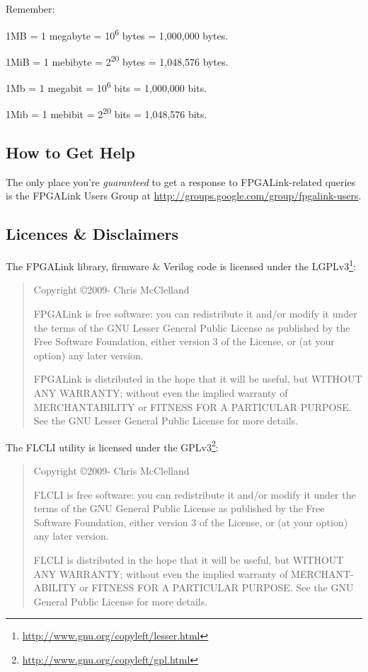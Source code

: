 Remember:
\begin{blobs}
  \item 1MB = 1 megabyte = 10\textsuperscript{6} bytes = 1,000,000 bytes.
  \item 1MiB = 1 mebibyte = 2\textsuperscript{20} bytes = 1,048,576 bytes.
  \item 1Mb = 1 megabit = 10\textsuperscript{6} bits = 1,000,000 bits.
  \item 1Mib = 1 mebibit = 2\textsuperscript{20} bits = 1,048,576 bits.
\end{blobs}

\subsection{How to Get Help}
The only place you're \textit{guaranteed} to get a response to FPGALink-related queries is the FPGALink Users Group at \url{http://groups.google.com/group/fpgalink-users}.

\newpage
\subsection{Licences \& Disclaimers}
The FPGALink library, firmware \& Verilog code is licensed under the LGPLv3\footnote{\url{http://www.gnu.org/copyleft/lesser.html}}:

\begin{quote}
Copyright \copyright 2009-{\the\year} Chris McClelland

FPGALink is free software: you can redistribute it and/or modify it under the terms of the GNU Lesser General Public License as published by the Free Software Foundation, either version 3 of the License, or (at your option) any later version.

FPGALink is distributed in the hope that it will be useful, but WITHOUT ANY WARRANTY; without even the implied warranty of MERCHANTABILITY or FITNESS FOR A PARTICULAR PURPOSE. See the GNU Lesser General Public License for more details.
\end{quote}

The FLCLI utility is licensed under the GPLv3\footnote{\url{http://www.gnu.org/copyleft/gpl.html}}:

\begin{quote}
Copyright \copyright 2009-{\the\year} Chris McClelland

FLCLI is free software: you can redistribute it and/or modify it under the terms of the GNU General Public License as published by the Free Software Foundation, either version 3 of the License, or (at your option) any later version.

FLCLI is distributed in the hope that it will be useful, but WITHOUT ANY WARRANTY; without even the implied warranty of MERCHANT-ABILITY or FITNESS FOR A PARTICULAR PURPOSE. See the GNU General Public License for more details.
\end{quote}


